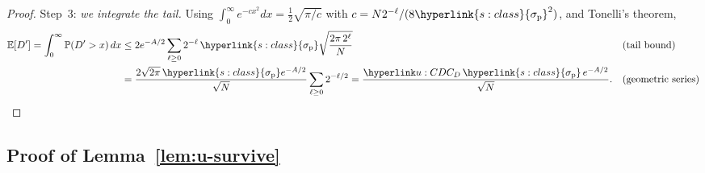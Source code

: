 \documentclass[11pt]{article}
\DeclareRobustCommand{\sy}[2]{{\hyperlink{#1}{#2}}}
\newcommand{\E}{\mathbb{E}}
\renewcommand{\P}{\mathbb{P}}
\newcommand{\1}{\mathbf{1}}
\newcommand{\sigp}{\sy{s:class}{\sigma_{\mathrm p}}}
\begin{document}
\begin{proof}
Step~3: \emph{we integrate the tail.} Using $\int_0^\infty e^{-cx^2}dx=\frac12\sqrt{\pi/c}$ with $c=N2^{-\ell}/(8\sigp^2)$, and Tonelli's theorem,
\begin{align*}
\E[D']=\int_0^\infty\P(D'>x)\,dx&\le2e^{-A/2}\sum_{\ell\ge0}2^{-\ell}\,\sigp\sqrt{\frac{2\pi\,2^{\ell}}N} &&\text{(tail bound)}\\
&=\frac{2\sqrt{2\pi}\,\sigp e^{-A/2}}{\sqrt N}\sum_{\ell\ge0}2^{-\ell/2}=\frac{\uCD\,\sigp\,e^{-A/2}}{\sqrt N}. &&\text{(geometric series)}\qedhere
\end{align*}
\end{proof}

\subsection{Proof of Lemma~\ref{lem:u-survive}}
\end{document}
